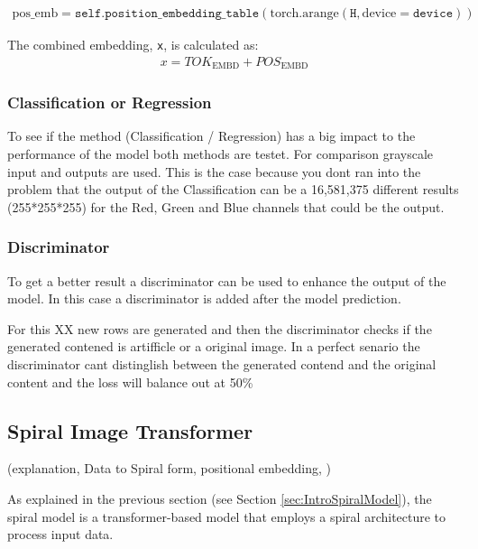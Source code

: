 \begin{align*}
    \text{pos\_emb} = \texttt{self.position\_embedding\_table}(\text{torch.arange}(\texttt{H}, \text{device}=\texttt{device}))
\end{align*}

The combined embedding, \texttt{x}, is calculated as:
\begin{align*}
    x = TOK_{\text{EMBD}} + POS_{\text{EMBD}}
\end{align*}

    

    \subsubsection{Classification or Regression}

    To see if the method (Classification / Regression) has a big impact to the performance of the model both methods are testet. For comparison grayscale input and outputs are used. This is the case because you dont ran into the problem that the output of the Classification can be a 16,581,375 different results (255*255*255) for the Red, Green and Blue channels that could be the output.



    \subsubsection{Discriminator}

    To get a better result a discriminator can be used to enhance the output of the model. In this case a discriminator is added after the model prediction.

    For this XX new rows are generated and then the discriminator checks if the generated contened is artifficle or a original image. In a perfect senario the discriminator cant distinglish between the generated contend and the original content and the loss will balance out at 50\%

\newpage


\subsection{Spiral Image Transformer}
    (explanation, Data to Spiral form, positional embedding, )

    As explained in the previous section (see Section \ref{sec:IntroSpiralModel}), the spiral model is a transformer-based model that employs a spiral architecture to process input data. 

